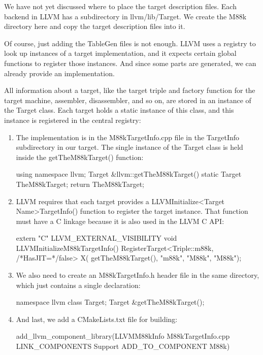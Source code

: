 We have not yet discussed where to place the target description files. Each backend in LLVM has a subdirectory in llvm/lib/Target. We create the M88k directory here and copy the target description files into it.

Of course, just adding the TableGen files is not enough. LLVM uses a registry to look up instances of a target implementation, and it expects certain global functions to register those instances. And since some parts are generated, we can already provide an implementation.

All information about a target, like the target triple and factory function for the target machine, assembler, disassembler, and so on, are stored in an instance of the Target class. Each target holds a static instance of this class, and this instance is registered in the central registry:

\begin{enumerate}
\item
The implementation is in the M88kTargetInfo.cpp file in the TargetInfo subdirectory in our target. The single instance of the Target class is held inside the getTheM88kTarget() function:

\begin{cpp}
using namespace llvm;
Target &llvm::getTheM88kTarget() {
    static Target TheM88kTarget;
    return TheM88kTarget;
}
\end{cpp}

\item
LLVM requires that each target provides a LLVMInitialize<Target Name>TargetInfo() function to register the target instance. That function must have a C linkage because it is also used in the LLVM C API:

\begin{cpp}
extern "C" LLVM_EXTERNAL_VISIBILITY void
LLVMInitializeM88kTargetInfo() {
    RegisterTarget<Triple::m88k, /*HasJIT=*/false> X(
        getTheM88kTarget(), "m88k", "M88k", "M88k");
}
\end{cpp}

\item
We also need to create an M88kTargetInfo.h header file in the same directory, which just contains a single declaration:

\begin{cpp}
namespace llvm {
class Target;
Target &getTheM88kTarget();
}
\end{cpp}

\item
And last, we add a CMakeLists.txt file for building:

\begin{cmake}
add_llvm_component_library(LLVMM88kInfo
    M88kTargetInfo.cpp
    LINK_COMPONENTS Support
    ADD_TO_COMPONENT M88k)
\end{cmake}

\end{enumerate}

